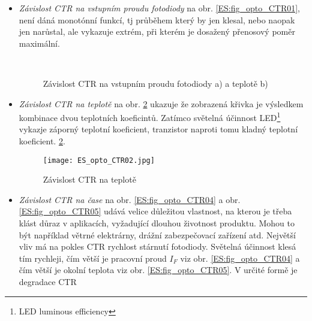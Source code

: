         \begin{itemize}
          \item \emph{Závislost CTR na vstupním proudu fotodiody} na obr. \ref{ES:fig_opto_CTR01},
                není dáná monotónní funkcí, tj průběhem který by jen klesal, nebo naopak jen
                narůstal, ale vykazuje extrém, při kterém je dosažený přenosový poměr maximální.
                \begin{figure}[ht!]
                  \centering
                      {}   \\
                      {}
                  \caption{Závislost CTR na vstupním proudu fotodiody a) a teplotě b)}
                  \label{ES:fig_opto_CTRparam}
                \end{figure}
          \item \emph{Závislost CTR na teplotě} na obr. \ref{ES:fig_opto_CTR02} ukazuje že
                zobrazená křivka je výsledkem kombinace dvou teplotních koeficintů. Zatímco
                světelná účinnost LED\footnote{LED luminous efficiency} vykazje záporný teplotní
                koeficient, tranzistor naproti tomu kladný teplotní koeficient.
                \ref{ES:fig_opto_CTR02}. 
                \begin{figure}[ht!]
                  \centering
                  \texttt{[image: ES\_opto\_CTR02.jpg]}
                  \caption{Závislost CTR na teplotě}
                  \label{ES:fig_opto_CTR02}
                \end{figure}
          \item \emph{Závislost CTR na čase} na obr. \ref{ES:fig_opto_CTR04} a obr.
                \ref{ES:fig_opto_CTR05} udává velice důležitou vlastnost, na kterou je třeba klást
                důraz v aplikacích, vyžadující dlouhou životnost produktu. Mohou to být
                například větrné elektrárny, drážní zabezpečovací zařízení atd. Největší vliv má na
                pokles CTR rychlost stárnutí fotodiody. Světelná účinnost klesá tím rychleji, čím
                větší je pracovní proud \(I_F\) viz obr. \ref{ES:fig_opto_CTR04} a čím větší je
                okolní teplota viz obr. \ref{ES:fig_opto_CTR05}. V určité formě je degradace CTR

\end{itemize}
